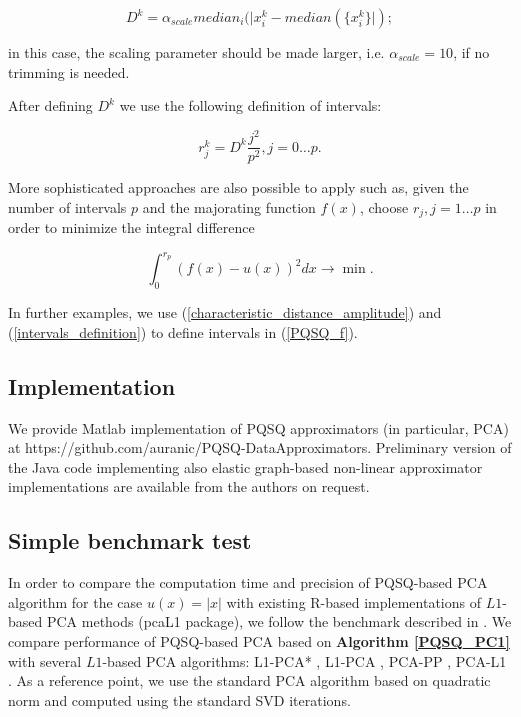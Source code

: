 \documentclass[preprint,12pt,twocolumn]{elsarticle}
\begin{document}
\begin{equation}\label{characteristic_distance_mad}
D^k = \alpha_{scale}median_i(|x_i^k-median(\{x_i^k\}|);
\end{equation}

\noindent in this case, the scaling parameter should be made larger, i.e. $\alpha_{scale}=10$, if no trimming is needed.

After defining $D^k$ we use the following definition of intervals:

\begin{equation}\label{intervals_definition}
r_j^k = D^k\frac{j^2}{p^2}, j=0\dots p.
\end{equation}

More sophisticated approaches are also possible to apply such as, given the number of intervals $p$ and the majorating function $f(x)$, choose $r_j, j=1\dots p$ in order to minimize the integral difference

$$
\int_0^{r_p}(f(x)-u(x))^2dx \rightarrow \min.
$$

In further examples, we use (\ref{characteristic_distance_amplitude}) and (\ref{intervals_definition}) to define intervals in (\ref{PQSQ_f}).

\subsection{Implementation}

We provide Matlab implementation of PQSQ approximators (in particular, PCA) at https://github.com/auranic/PQSQ-DataApproximators.
Preliminary version of the Java code implementing also elastic graph-based non-linear approximator implementations are available from
the authors on request.

%

\subsection{Simple benchmark test}

In order to compare the computation time and precision of PQSQ-based PCA algorithm for the case $u(x)=|x|$ with existing R-based implementations of $L1$-based PCA methods (pcaL1 package), we follow the benchmark described in \cite{brooks2012pcal1}. We compare performance of PQSQ-based PCA based on \textbf{Algorithm \ref{PQSQ_PC1}} with several $L1$-based PCA algorithms: L1-PCA* \cite{Brooks2013}, L1-PCA \cite{Ke2005}, PCA-PP \cite{Croux2007}, PCA-L1 \cite{Kwak2008}. As a reference point, we use the standard PCA algorithm based on quadratic norm and computed using the standard SVD iterations. 
\end{document}
